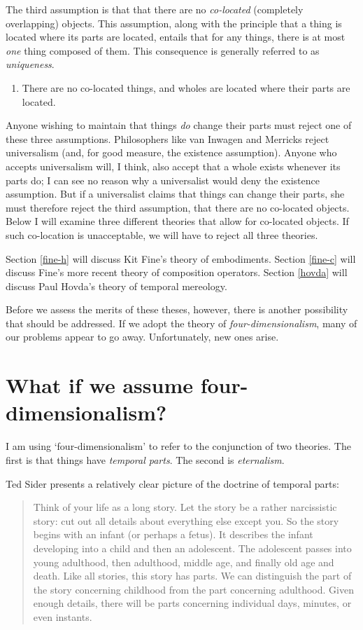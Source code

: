 \documentclass[12pt,twoside]{reedfancy}
\begin{document}
\begin{spacing}{1.25}
The third assumption is that that there are no {\em co-located}
(completely overlapping) objects.  This assumption, along with the
principle that a thing is located where its parts are located, entails
that for any things, there is at most {\em one} thing composed of
them.  This consequence is generally referred to as {\em uniqueness}.

\begin{enumerate}[start=3, ref=(\arabic*)]
  \item There are no co-located things, and wholes are located where
    their parts are located. \label{ass-co}
\end{enumerate}

Anyone wishing to maintain that things {\em do} change their parts
must reject one of these three assumptions.  Philosophers like van
Inwagen and Merricks reject universalism (and, for good measure, the
existence assumption).  Anyone who accepts universalism will, I think,
also accept that a whole exists whenever its parts do; I can see no
reason why a universalist would deny the existence assumption.  But if
a universalist claims that things can change their parts, she must
therefore reject the third assumption, that there are no co-located
objects.  Below I will examine three different theories that allow for
co-located objects.  If such co-location is unacceptable, we will have
to reject all three theories.

Section \ref{fine-h} will discuss Kit Fine's theory of embodiments.
Section \ref{fine-c} will discuss Fine's more recent theory of
composition operators.  Section \ref{hovda} will discuss Paul Hovda's
theory of temporal mereology.

Before we assess the merits of these theses, however, there is another
possibility that should be addressed.  If we adopt the theory of {\em
  four-dimensionalism}, many of our problems appear to go away.
Unfortunately, new ones arise.

\section{What if we assume four-dimensionalism?}
\label{4d}
I am using `four-dimensionalism' to refer to the conjunction of two
theories.  The first is that things have {\em temporal parts}.  The
second is {\em eternalism}.

Ted Sider presents a relatively clear picture of the doctrine of
temporal parts:

\begin{quote}
Think of your life as a long story.  Let the story be a rather
narcissistic story: cut out all details about everything else except
you.  So the story begins with an infant (or perhaps a fetus).  It
describes the infant developing into a child and then an adolescent.
The adolescent passes into young adulthood, then adulthood, middle
age, and finally old age and death.  Like all stories, this story has
parts.  We can distinguish the part of the story concerning childhood
from the part concerning adulthood.  Given enough details, there will
be parts concerning individual days, minutes, or even instants.


\end{quote}
\end{spacing}
\end{document}
